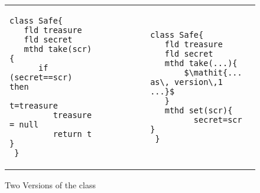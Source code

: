  \begin{figure}[htb]
 \begin{tabular}{lll} %
\begin{minipage}{0.45\textwidth}
\begin{lstlisting}
class Safe{
   fld treasure 
   fld secret 
   mthd take(scr){
      if (secret==scr) then 
         t=treasure
         treasure = null
         return t   }
 }
\end{lstlisting}
\end{minipage}
  &\ \ \  \ \ \ \ \  &
\begin{minipage}{0.45\textwidth}
\begin{lstlisting}
class Safe{
   fld treasure   
   fld secret  
   mthd take(...){
       $\mathit{... as\, version\,1 ...}$ 
   }
   mthd set(scr){
         secret=scr }
 }
\end{lstlisting}
\end{minipage} 
 \end{tabular}
  \vspace*{-0.95cm}
  \caption{Two Versions of the class }
 \label{fig:ExampleSafe}
 \vspace*{-0.65cm}
 \end{figure}
 

